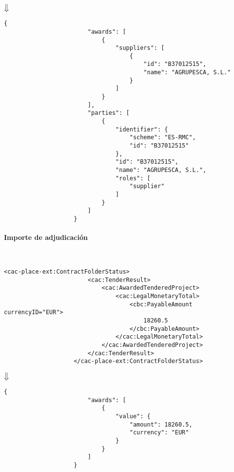                 \begin{center}
                    $\big\Downarrow$
                \end{center}
\newpage
                \begin{lstlisting}[language=lJSON]
                    {
                        "awards": [
                            {
                                "suppliers": [
                                    {
                                        "id": "B37012515",
                                        "name": "AGRUPESCA, S.L."
                                    }
                                ]
                            }
                        ],
                        "parties": [
                            {
                                "identifier": {
                                    "scheme": "ES-RMC",
                                    "id": "B37012515"
                                },
                                "id": "B37012515",
                                "name": "AGRUPESCA, S.L.",
                                "roles": [
                                    "supplier"
                                ]
                            }
                        ]
                    }
                \end{lstlisting}
                
            \paragraph{Importe de adjudicación} \mbox{}\\
                \begin{lstlisting}[language=lXML]
                    <cac-place-ext:ContractFolderStatus>
                        <cac:TenderResult>
                            <cac:AwardedTenderedProject>
                                <cac:LegalMonetaryTotal>
                                    <cbc:PayableAmount currencyID="EUR">
                                        18260.5
                                    </cbc:PayableAmount>
                                </cac:LegalMonetaryTotal>
                            </cac:AwardedTenderedProject>
                        </cac:TenderResult>
                    </cac-place-ext:ContractFolderStatus>
                \end{lstlisting}
                
                \begin{center}
                    $\big\Downarrow$
                \end{center}
\newpage
                \begin{lstlisting}[language=lJSON]
                    {
                        "awards": [
                            {
                                "value": {
                                    "amount": 18260.5,
                                    "currency": "EUR"
                                }
                            }
                        ]
                    }
                \end{lstlisting}
                
